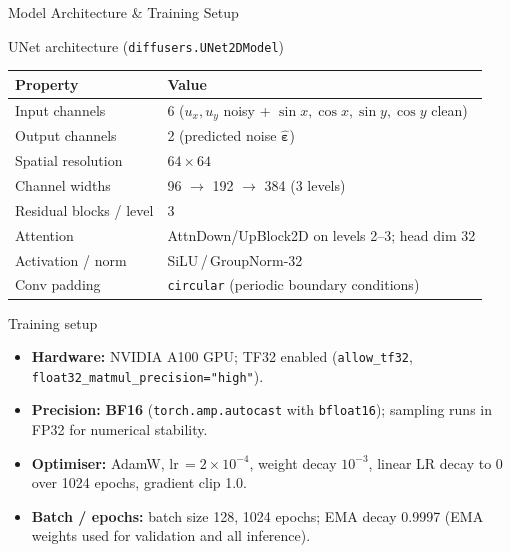 \documentclass[9pt]{beamer}
\begin{document}
\begin{frame}{Model Architecture \& Training Setup}
\begin{block}{UNet architecture (\texttt{diffusers.UNet2DModel})}
\renewcommand{\arraystretch}{1.15}
\begin{center}
\begin{tabular}{ll}
\toprule
\textbf{Property} & \textbf{Value} \\
\midrule
Input channels & 6 \;($u_x, u_y$ noisy + $\sin x, \cos x, \sin y, \cos y$ clean) \\
Output channels & 2 \;(predicted noise $\hat{\boldsymbol{\varepsilon}}$) \\
Spatial resolution & $64\times64$ \\
Channel widths & 96 $\to$ 192 $\to$ 384 (3 levels) \\
Residual blocks / level & 3 \\
Attention & AttnDown/UpBlock2D on levels 2--3; head dim 32 \\
Activation / norm & SiLU\,/\,GroupNorm-32 \\
Conv padding & \texttt{circular} (periodic boundary conditions) \\
\bottomrule
\end{tabular}
\end{center}
\end{block}
\begin{block}{Training setup}
\begin{itemize}
  \item \textbf{Hardware:} NVIDIA A100 GPU; TF32 enabled (\texttt{allow\_tf32},
        \texttt{float32\_matmul\_precision="high"}).
  \item \textbf{Precision:} \textbf{BF16} (\texttt{torch.amp.autocast} with \texttt{bfloat16});
        sampling runs in FP32 for numerical stability.
  \item \textbf{Optimiser:} AdamW, lr\,$=2\!\times\!10^{-4}$, weight decay $10^{-3}$,
        linear LR decay to 0 over 1024 epochs, gradient clip 1.0.
  \item \textbf{Batch / epochs:} batch size 128, 1024 epochs; EMA decay 0.9997
        (EMA weights used for validation and all inference).
\end{itemize}
\end{block}
\end{frame}

\end{document}
